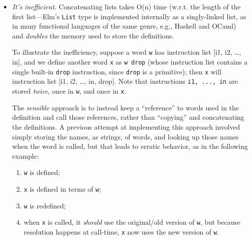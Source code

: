 \documentclass[
]{article}
\providecommand{\tightlist}{%
  \setlength{\itemsep}{0pt}\setlength{\parskip}{0pt}}
\begin{document}
\begin{itemize}
  \begin{itemize}
  \item
    \emph{It's inefficient.} Concatenating lists takes O(n) time (w.r.t.
    the length of the first list---Elm's \texttt{List} type is
    implemented internally as a singly-linked list, as in many
    functional languages of the same genre, e.g., Haskell and OCaml) and
    \emph{doubles} the memory used to store the definitions.

    To illustrate the inefficiency, suppose a word \texttt{w} has
    instruction list {[}i1, i2, \ldots, in{]}, and we define another
    word \texttt{x} as \texttt{w\ drop} (whose instruction list contains
    a single built-in \texttt{drop} instruction, since \texttt{drop} is
    a primitive); then \texttt{x} will instruction list {[}i1, i2,
    \ldots, in, drop{]}. Note that instructions \texttt{i1,\ ...,\ in}
    are stored \emph{twice}, once in \texttt{w}, and once in \texttt{x}.

    The \emph{sensible} approach is to instead keep a ``reference'' to
    words used in the definition and call those references, rather than
    ``copying'' and concatenating the definitions. A previous attempt at
    implementing this approach involved simply storing the names, as
    strings, of words, and looking up those names when the word is
    called, but that leads to erratic behavior, as in the following
    example:

    \begin{enumerate}
    \def\labelenumi{\arabic{enumi}.}
    \tightlist
    \item
      \texttt{w} is defined;
    \item
      \texttt{x} is defined in terms of \texttt{w};
    \item
      \texttt{w} is redefined;
    \item
      when \texttt{x} is called, it \emph{should} use the original/old
      version of \texttt{w}, but because resolution happens at
      call-time, \texttt{x} now uses the new version of \texttt{w}.
    \end{enumerate}


\end{itemize}
\end{itemize}
\end{document}
